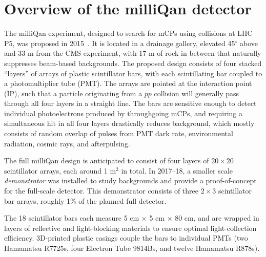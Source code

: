 {\section{Overview of the milliQan detector}
The milliQan experiment, designed to search for mCPs using collisions at LHC P5, was proposed in 
2015~\cite{Haas:mcp,mq:loi}. It is located in a drainage gallery, elevated 45$^\circ$ above and 33
m from the CMS experiment, with 17 m of rock in between that naturally
suppresses beam-based backgrounds. The proposed design consists of four stacked ``layers'' of arrays of plastic 
scintillator bars, with each scintillating bar coupled to a photomultiplier tube (PMT).
The arrays are pointed at the interaction point (IP), such that a particle originating
from a $pp$ collision will generally pass through all four layers in a straight line.
The bars are sensitive enough to detect individual photoelectrons produced by
throughgoing mCPs, and requiring a simultaneous hit in all four layers drastically
reduces background, which mostly consists of random overlap of pulses from
PMT dark rate, environmental radiation, cosmic rays, and afterpulsing.

The full milliQan design is anticipated to consist of four layers of $20\times20$ scintillator arrays,
each around 1 m$^2$ in total. In 2017--18, a smaller scale \textit{demonstrator} was installed
to study backgrounds and provide a proof-of-concept for the full-scale detector.
This demonstrator consists of three $2\times3$ scintillator bar arrays, roughly 1\%
of the planned full detector.

The 18 scintillator bars each measure 5 cm $\times$ 5 cm $\times$ 80 cm, and are
wrapped in layers of reflective and light-blocking materials to ensure optimal
light-collection efficiency. 3D-printed plastic casings couple the bars to individual PMTs
(two Hamamatsu R7725s, four Electron Tube 9814Bs, and twelve Hamamatsu R878s).

}
